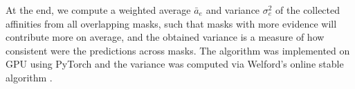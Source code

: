 At the end, we compute a weighted average $\bar{a}_e$ and variance $\sigma^2_e$ of the collected affinities from all overlapping masks, such that masks with more evidence will contribute more on average, and the obtained variance is a measure of how consistent were the predictions across masks. 
The algorithm was implemented on GPU using PyTorch \cite{NEURIPS2019_9015} and the variance was computed via Welford's online stable algorithm \cite{welford1962note}.




